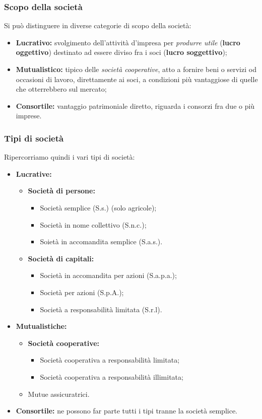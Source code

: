 \documentclass[a4paper,11pt]{article}
\begin{document}
\subsubsection{Scopo della società}
Si può distinguere in diverse categorie di scopo della società:
\begin{itemize}
	\item \textbf{Lucrativo:} svolgimento dell'attività d'impresa per \textit{produrre utile} (\textbf{lucro oggettivo}) destinato ad essere diviso fra i soci (\textbf{lucro soggettivo});
	\item \textbf{Mutualistico:} tipico delle \textit{società cooperative}, atto a fornire beni o servizi od occasioni di lavoro, direttamente ai soci, a condizioni più vantaggiose di quelle che otterrebbero sul mercato;
	\item \textbf{Consortile:} vantaggio patrimoniale diretto, riguarda i consorzi fra due o più imprese.
\end{itemize}

\subsubsection{Tipi di società}
Ripercorriamo quindi i vari tipi di società:
\begin{itemize}
	\item \textbf{Lucrative:}
		\begin{itemize}
			\item \textbf{Società di persone:}
				\begin{itemize}
					\item Società semplice (S.s.) (solo agricole);
					\item Società in nome collettivo (S.n.c.);
					\item Soietà in accomandita semplice (S.a.s.).
				\end{itemize}
			\item \textbf{Società di capitali:}
				\begin{itemize}
					\item Società in accomandita per azioni (S.a.p.a.);
					\item Società per azioni (S.p.A.);
					\item Società a responsabilità limitata (S.r.l).
				\end{itemize}
		\end{itemize}
	\item \textbf{Mutualistiche:}
		\begin{itemize}
			\item \textbf{Società cooperative:}
				\begin{itemize}
					\item Società cooperativa a responsabilità limitata;
					\item Società cooperativa a responsabilità illimitata;
				\end{itemize}
			\item Mutue assicuratrici.
		\end{itemize}
	\item \textbf{Consortile:} ne possono far parte tutti i tipi tranne la società semplice.
\end{itemize}
\end{document}
